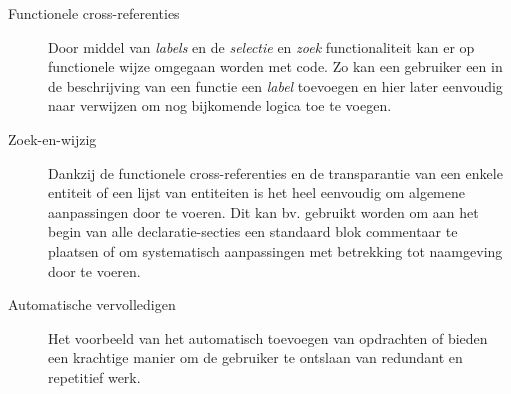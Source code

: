 \begin{description}

  \item[Functionele cross-referenties] Door middel van \emph{labels} en de
  \emph{selectie} en \emph{zoek} functionaliteit kan er op functionele wijze
  omgegaan worden met code. Zo kan een gebruiker een in de beschrijving van een
  functie een \emph{label} toevoegen en hier later eenvoudig naar verwijzen om
  nog bijkomende logica toe te voegen.

  \item[Zoek-en-wijzig] Dankzij de functionele cross-referenties en de
  transparantie van een enkele entiteit of een lijst van entiteiten is het heel
  eenvoudig om algemene aanpassingen door te voeren. Dit kan bv. gebruikt
  worden om aan het begin van alle declaratie-secties een standaard blok
  commentaar te plaatsen of om systematisch aanpassingen met betrekking tot
  naamgeving door te voeren.

  \item[Automatische vervolledigen] Het voorbeeld van het automatisch toevoegen
  van  opdrachten of  bieden een krachtige manier
  om de gebruiker te ontslaan van redundant en repetitief werk.

\end{description}
